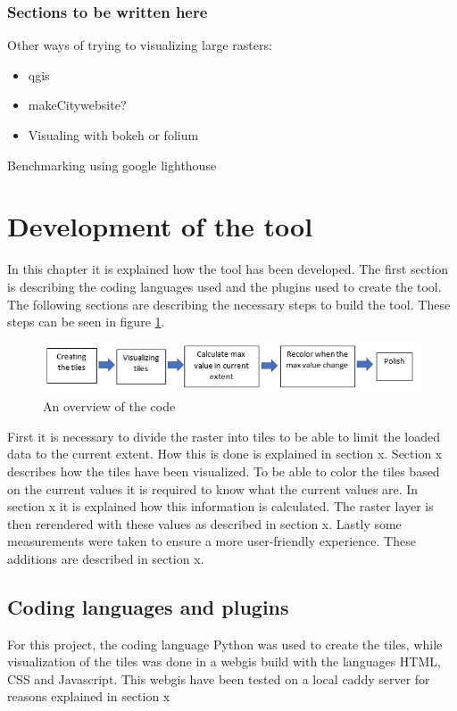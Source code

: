 \section{Sections to be written here} 

Other ways of trying to visualizing large rasters:

\begin{itemize}
	\item qgis
	\item makeCitywebsite?
	\item Visualing with bokeh or folium 
\end{itemize}

Benchmarking using google lighthouse


\part{Development of the tool}
In this chapter it is explained how the tool has been developed. The first section is describing the coding languages used and the plugins used to create the tool. The following sections are describing the necessary steps to build the tool. These steps can be seen in figure \ref{DevelopmentSteps}.
 
 \begin{figure} [H]
 	\centering
 	\includegraphics[width=.8\textwidth]{Pictures/DevelopmentSteps}
 	\caption{An overview of the code}
 	\label{DevelopmentSteps}
 \end{figure}
 
First it is necessary to divide the raster into tiles to be able to limit the loaded data to the current extent. How this is done is explained in section x. Section x describes how the tiles have been visualized. To be able to color the tiles based on the current values it is required to know what the current values are. In section x it is explained how this information is calculated. The raster layer is then rerendered with these values as described in section x. Lastly some measurements were taken to ensure a more user-friendly experience. These additions are described in section x. 

\chapter{Coding languages and plugins}
For this project, the coding language Python was used to create the tiles, while visualization of the tiles was done in a webgis build with the languages HTML, CSS and Javascript. This webgis have been tested on a local caddy server for reasons explained in section x

